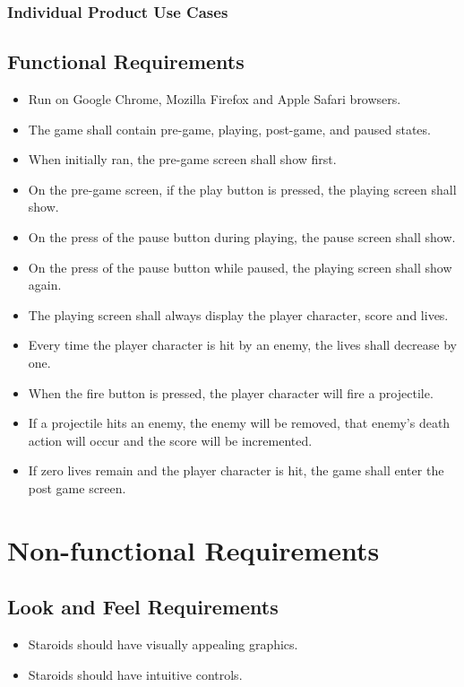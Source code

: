 \documentclass[12pt, titlepage]{article}
\begin{document}
\subsubsection{Individual Product Use Cases}

\subsection{Functional Requirements}
  \begin{itemize}
    \item Run on Google Chrome, Mozilla Firefox and Apple Safari browsers.
    \item The game shall contain pre-game, playing, post-game, and paused states.
    \item When initially ran, the pre-game screen shall show first.
    \item On the pre-game screen, if the play button is pressed, the playing screen shall show.
    \item On the press of the pause button during playing, the pause screen shall show.
    \item On the press of the pause button while paused, the playing screen shall show again.
    \item The playing screen shall always display the player character, score and lives.
    \item Every time the player character is hit by an enemy, the lives shall decrease by one.
    \item When the fire button is pressed, the player character will fire a projectile.
    \item If a projectile hits an enemy, the enemy will be removed, that enemy's death action will occur and the score will be incremented.
    \item If zero lives remain and the player character is hit, the game shall enter the post game screen.
    
  \end{itemize}

\section{Non-functional Requirements}

\subsection{Look and Feel Requirements}
  \begin{itemize}
    \item Staroids should have visually appealing graphics.
    \item Staroids should have intuitive controls.
  \end{itemize}
\end{document}
